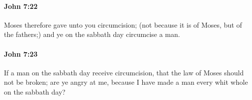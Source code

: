 		\paragraph{John 7:22} %
			\label{JOHN-7-22}

			Moses therefore gave unto you circumcision; (not because it is of Moses, but of the fathers;) and ye on the sabbath day circumcise a man.

			\begin{framed}
			\scriptsize
				\begin{compactdesc}
					\item[SBLG] 
				\end{compactdesc}
			\end{framed}

		\paragraph{John 7:23} %
			\label{JOHN-7-23}

			If a man on the sabbath day receive circumcision, that the law of Moses should not be broken; are ye angry at me, because I have made a man every whit whole on the sabbath day?

